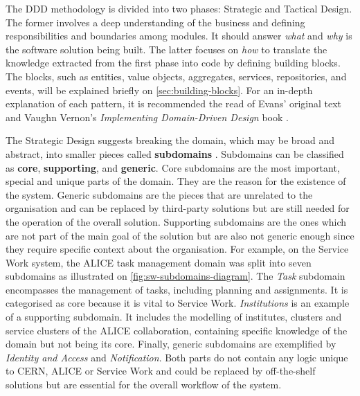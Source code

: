 The DDD methodology is divided into two phases: Strategic and Tactical Design. The former involves a deep understanding of the business and defining responsibilities and boundaries among modules. It should answer \textit{what} and \textit{why} is the software solution being built. The latter focuses on \textit{how} to translate the knowledge extracted from the first phase into code by defining building blocks. The blocks, such as entities, value objects, aggregates, services, repositories, and events, will be explained briefly on \autoref{sec:building-blocks}. For an in-depth explanation of each pattern, it is recommended the read of Evans' original text \cite{ddd-blue-book} and Vaughn Vernon's \textit{Implementing Domain-Driven Design} book \cite{ddd-red-book}.

The Strategic Design suggests breaking the domain, which may be broad and abstract, into smaller pieces called \textbf{subdomains} \cite{petter-holmstrom-part1}. Subdomains can be classified as \textbf{core}, \textbf{supporting}, and \textbf{generic}. Core subdomains are the most important, special and unique parts of the domain. They are the reason for the existence of the system. Generic subdomains are the pieces that are unrelated to the organisation and can be replaced by third-party solutions but are still needed for the operation of the overall solution. Supporting subdomains are the ones which are not part of the main goal of the solution but are also not generic enough since they require specific context about the organisation. For example, on the Service Work system, the ALICE task management domain was split into seven subdomains as illustrated on \autoref{fig:sw-subdomains-diagram}. The \textit{Task} subdomain encompasses the management of tasks, including planning and assignments. It is categorised as core because it is vital to Service Work. \textit{Institutions} is an example of a supporting subdomain. It includes the modelling of institutes, clusters and service clusters of the ALICE collaboration, containing specific knowledge of the domain but not being its core. Finally, generic subdomains are exemplified by \textit{Identity and Access} and \textit{Notification}. Both parts do not contain any logic unique to CERN, ALICE or Service Work and could be replaced by off-the-shelf solutions but are essential for the overall workflow of the system.

